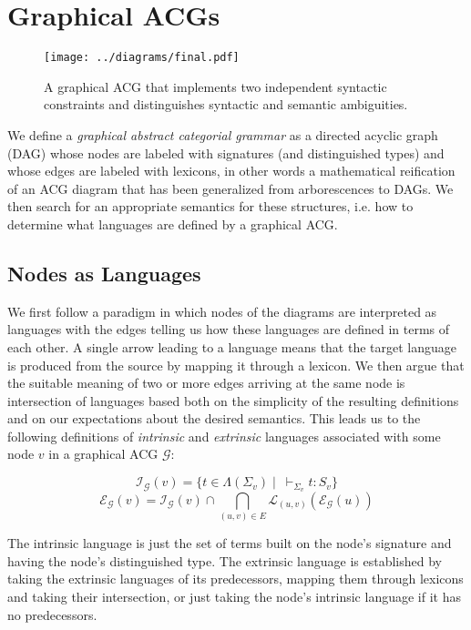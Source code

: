 \documentclass{llncs}
\begin{document}
\section{Graphical ACGs}

\begin{figure}
  \centering
  \texttt{[image: ../diagrams/final.pdf]}
  \caption{\label{fig:gacg} A graphical ACG that implements two
      independent syntactic constraints and distinguishes syntactic and
      semantic ambiguities.}
\end{figure}

We define a \emph{graphical abstract categorial grammar} as a directed acyclic
graph (DAG) whose nodes are labeled with signatures (and distinguished types)
and whose edges are labeled with lexicons, in other words a mathematical
reification of an ACG diagram that has been generalized from
arborescences to DAGs. We then search for an appropriate semantics for these
structures, i.e. how to determine what languages are defined by a graphical
ACG.

\subsection{Nodes as Languages}

We first follow a paradigm in which nodes of the diagrams are
interpreted as languages with the edges telling us how these languages
are defined in terms of each other. A single arrow leading to a language
means that the target language is produced from the source by mapping it
through a lexicon. We then argue that the suitable meaning of two or
more edges arriving at the same node is intersection of languages based
both on the simplicity of the resulting definitions and on our
expectations about the desired semantics. This leads us to the following
definitions of \emph{intrinsic} and \emph{extrinsic} languages
associated with some node $v$ in a graphical ACG $\mathcal{G}$:

$$
\mathcal{I}_{\mathcal{G}}(v) = \{t \in \Lambda(\Sigma_v)
\mid\ \vdash_{\Sigma_v} t : S_v\}
$$
$$
\mathcal{E}_{\mathcal{G}}(v) = \mathcal{I}_{\mathcal{G}}(v) \cap
\bigcap_{(u,v) \in E} \mathcal{L}_{(u,v)}(\mathcal{E}_{\mathcal{G}}(u))
$$

The intrinsic language is just the set of terms built on the node's
signature and having the node's distinguished type. The extrinsic
language is established by taking the extrinsic languages of its
predecessors, mapping them through lexicons and taking their
intersection, or just taking the node's intrinsic language if it has no
predecessors.
\end{document}
